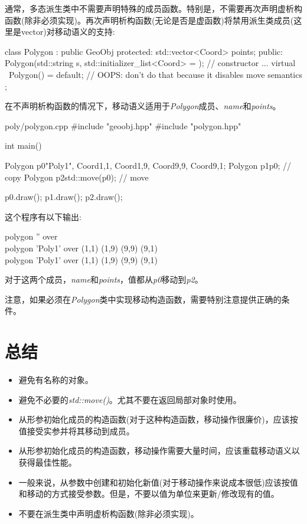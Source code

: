 通常，多态派生类中不需要声明特殊的成员函数。特别是，不需要再次声明虚析构函数(除非必须实现)。再次声明析构函数(无论是否是虚函数)将禁用派生类成员(这里是vector)对移动语义的支持:\par

\begin{codebox}[cpp]
class Polygon : public GeoObj {
protected:
  std::vector<Coord> points;
public:
  Polygon(std::string s, std::initializer_list<Coord> = {}); // constructor
  ...
  virtual ~Polygon() = default; // OOPS: don’t do that because it disables move semantics
};
\end{codebox}

在不声明析构函数的情况下，移动语义适用于\textit{Polygon}成员、\textit{name}和\textit{points}。\par

\begin{codeboxt}[cpp]{poly/polygon.cpp}
#include "geoobj.hpp"
#include "polygon.hpp"

int main()
{
  Polygon p0{"Poly1", {Coord{1,1}, Coord{1,9}, Coord{9,9}, Coord{9,1}}};
  Polygon p1{p0}; // copy
  Polygon p2{std::move(p0)}; // move

  p0.draw();
  p1.draw();
  p2.draw();
}
\end{codeboxt}

这个程序有以下输出:\par

\begin{myOutput}
polygon '' over \\
polygon 'Poly1' over (1,1) (1,9) (9,9) (9,1) \\
polygon 'Poly1' over (1,1) (1,9) (9,9) (9,1)
\end{myOutput}

对于这两个成员，\textit{name}和\textit{points}，值都从\textit{p0}移动到\textit{p2}。\par

注意，如果必须在\textit{Polygon}类中实现移动构造函数，需要特别注意提供正确的条件。\par


\section{总结}

\begin{itemize}
  \item 避免有名称的对象。
  \item 避免不必要的\textit{std::move()}。尤其不要在返回局部对象时使用。
  \item 从形参初始化成员的构造函数(对于这种构造函数，移动操作很廉价)，应该按值接受实参并将其移动到成员。
  \item 从形参初始化成员的构造函数，移动操作需要大量时间，应该重载移动语义以获得最佳性能。
  \item 一般来说，从参数中创建和初始化新值(对于移动操作来说成本很低)应该按值和移动的方式接受参数。但是，不要以值为单位来更新/修改现有的值。
  \item 不要在派生类中声明虚析构函数(除非必须实现)。
\end{itemize}
